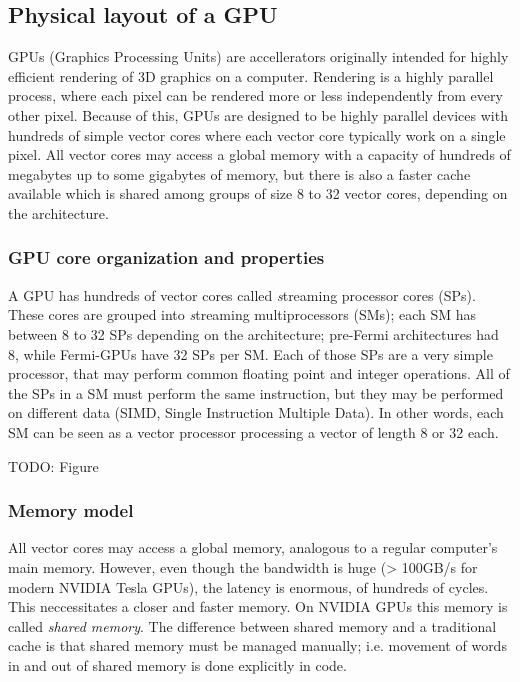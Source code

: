 \subsection{Physical layout of a GPU}
GPUs (Graphics Processing Units) are accellerators originally intended for highly efficient rendering of 3D graphics on a computer. Rendering is a highly parallel process, where each pixel can be rendered more or less independently from every other pixel. Because of this, GPUs are designed to be highly parallel devices with hundreds of simple vector cores where each vector core typically work on a single pixel. All vector cores may access a global memory with a capacity of hundreds of megabytes up to some gigabytes of memory, but there is also a faster cache available which is shared among groups of size 8 to 32 vector cores, depending on the architecture.

\subsubsection{GPU core organization and properties}
A GPU has hundreds of vector cores called {\textit streaming processor cores} (SPs). These cores are grouped into {\textit streaming multiprocessors} (SMs); each SM has between 8 to 32 SPs depending on the architecture; pre-Fermi architectures had 8, while Fermi-GPUs have 32 SPs per SM. Each of those SPs are a very simple processor, that may perform common floating point and integer operations. All of the SPs in a SM must perform the same instruction, but they may be performed on different data (SIMD, Single Instruction Multiple Data). In other words, each SM can be seen as a vector processor processing a vector of length 8 or 32 each.

TODO: Figure



\subsubsection{Memory model}
All vector cores may access a global memory, analogous to a regular computer's main memory. However, even though the bandwidth is huge (> 100GB/s for modern NVIDIA Tesla GPUs), the latency is enormous, of hundreds of cycles. This neccessitates a closer and faster memory. On NVIDIA GPUs this memory is called \textit{shared memory}. The difference between shared memory and a traditional cache is that shared memory must be managed manually; i.e. movement of words in and out of shared memory is done explicitly in code.

